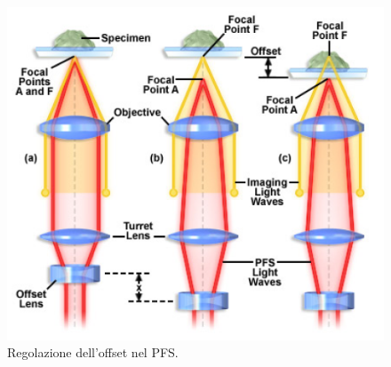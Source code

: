 \begin{itemize}
\begin{figure}[!ht]
 \centering
 \includegraphics[scale=.40]{img/CAP2PFS.png}
 \caption{\small{Regolazione dell'offset nel PFS.}}
 \label{fig:PFS}
\end{figure}


\end{itemize}
